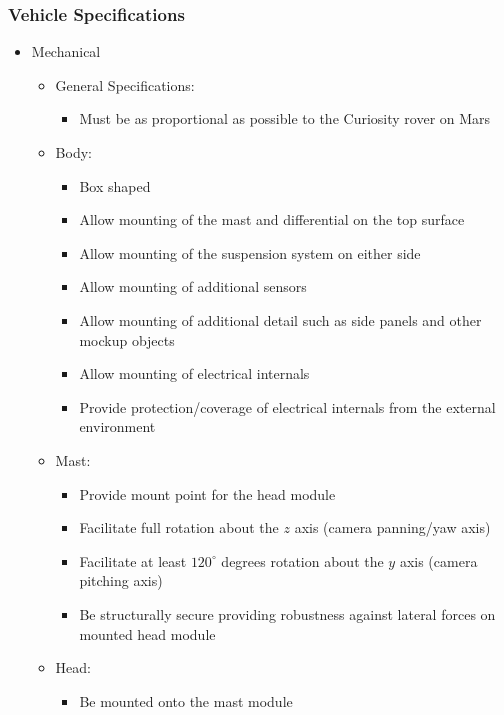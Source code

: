     \subsubsection{Vehicle Specifications}
      \begin{itemize}
        \item Mechanical
        \begin{itemize}
          \item General Specifications:
          \begin{itemize}
            \item Must be as proportional as possible to the Curiosity rover on Mars
          \end{itemize}
          \item Body:
          \begin{itemize}
            \item Box shaped
            \item Allow mounting of the mast and differential on the top surface
            \item Allow mounting of the suspension system on either side
            \item Allow mounting of additional sensors
            \item Allow mounting of additional detail such as side panels and other mockup objects
            \item Allow mounting of electrical internals
            \item Provide protection/coverage of electrical internals from the external environment
          \end{itemize}
          \item Mast:
          \begin{itemize}
            \item Provide mount point for the head module
            \item Facilitate full rotation about the $z$ axis (camera panning/yaw axis)
            \item Facilitate at least $120^\circ$ degrees rotation about the $y$ axis (camera pitching axis)
            \item Be structurally secure providing robustness against lateral forces on mounted head module
          \end{itemize}
          \item Head:
          \begin{itemize}
            \item Be mounted onto the mast module

\end{itemize}
\end{itemize}
\end{itemize}
